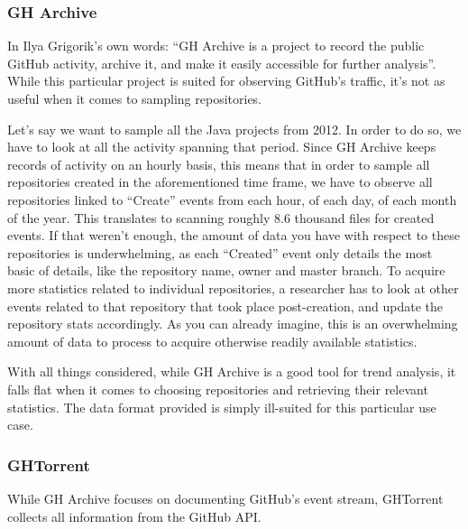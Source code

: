 \subsubsection{GH Archive}

In Ilya Grigorik's own words: ``GH Archive is a project to record the public GitHub activity, archive it, and make it easily accessible for further analysis''. %
While this particular project is suited for observing GitHub's traffic, it's not as useful when it comes to sampling repositories.

Let's say we want to sample all the Java projects from 2012.
In order to do so, we have to look at all the activity spanning that period.
Since GH Archive keeps records of activity on an hourly basis, this means that in order to sample all repositories created in the aforementioned time frame, we have to observe all repositories linked to ``Create'' events from each hour, of each day, of each month of the year.
This translates to scanning roughly 8.6 thousand files for created events.
If that weren't enough, the amount of data you have with respect to these repositories is underwhelming, as each ``Created'' event only details the most basic of details, like the repository name, owner and master branch.
To acquire more statistics related to individual repositories, a researcher has to look at other events related to that repository that took place post-creation, and update the repository stats accordingly.
As you can already imagine, this is an overwhelming amount of data to process to acquire otherwise readily available statistics.

With all things considered, while GH Archive is a good tool for trend analysis, it falls flat when it comes to choosing repositories and retrieving their relevant statistics.
The data format provided is simply ill-suited for this particular use case.

\subsubsection{GHTorrent}

While GH Archive focuses on documenting GitHub's event stream, GHTorrent collects all information from the GitHub API. %